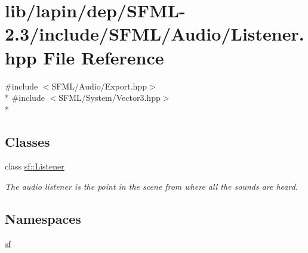 \hypertarget{lapin_2dep_2_s_f_m_l-2_83_2include_2_s_f_m_l_2_audio_2_listener_8hpp}{\section{lib/lapin/dep/\-S\-F\-M\-L-\/2.3/include/\-S\-F\-M\-L/\-Audio/\-Listener.hpp File Reference}
\label{lapin_2dep_2_s_f_m_l-2_83_2include_2_s_f_m_l_2_audio_2_listener_8hpp}
}
{\ttfamily \#include $<$S\-F\-M\-L/\-Audio/\-Export.\-hpp$>$}\\*
{\ttfamily \#include $<$S\-F\-M\-L/\-System/\-Vector3.\-hpp$>$}\\*
\subsection*{Classes}
\begin{DoxyCompactItemize}
\item 
class \hyperlink{classsf_1_1_listener}{sf\-::\-Listener}
\begin{DoxyCompactList}\small\item\em The audio listener is the point in the scene from where all the sounds are heard. \end{DoxyCompactList}\end{DoxyCompactItemize}
\subsection*{Namespaces}
\begin{DoxyCompactItemize}
\item 
\hyperlink{namespacesf}{sf}
\end{DoxyCompactItemize}

